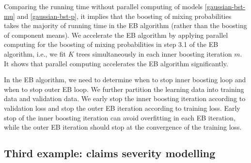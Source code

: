 \documentclass[11pt]{article}
\numberwithin{equation}{section}
\begin{document}
Comparing the running time without parallel computing of models \eqref{gaussian-bst-mu} and \eqref{gaussian-bst-p}, it implies that the boosting of mixing probabilities takes the majority of running time in the EB algorithm (rather than the boosting of component means).
We accelerate the EB algorithm by applying parallel computing for the boosting of mixing probabilities in step 3.1 of the EB algorithm, i.e., we fit $K$ trees  simultaneously in each inner boosting iteration $m$.
It shows that parallel computing accelerates the EB algorithm significantly.   


In the EB algorithm, we need to determine when to stop inner boosting loop and when to stop outer EB loop.
We further partition the learning data into training data and validation data. 
We early stop the inner boosting iteration according to validation loss and stop the outer EB iteration according to training loss. Early stop of the inner boosting iteration can avoid overfitting in each EB iteration, while the outer EB iteration should stop at the convergence of the training loss.


\subsection{Third example: claims severity modelling}\label{sec:third example}
\end{document}
